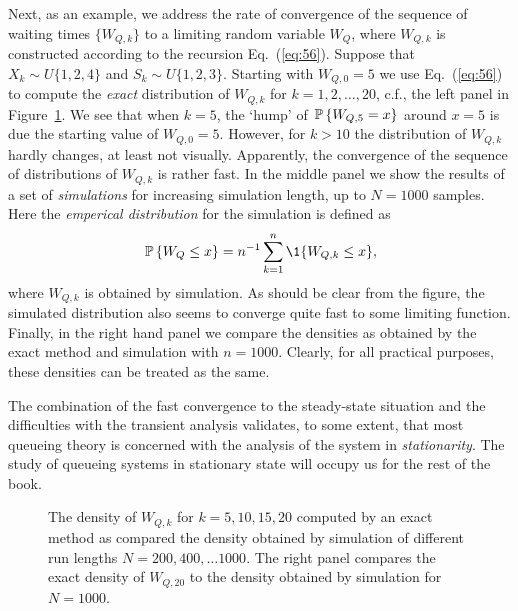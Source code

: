 Next, as an example, we address the rate of convergence of the
sequence of waiting times $\{W_{Q,k}\}$ to a limiting random variable
$W_Q$, where $W_{Q,k}$ is constructed according to the recursion
Eq.~(\ref{eq:56}). Suppose that $X_k\sim U\{1,2,4\}$ and
$S_k\sim U\{1,2,3\}$.  Starting with $W_{Q,0}=5$ we use
Eq.~(\ref{eq:56}) to compute the \emph{exact} distribution of
$W_{Q,k}$ for $k=1,2,\ldots, 20$, c.f., the left panel in
Figure~\ref{fig:convergence}. We see that when $k=5$, the `hump' of
$\P{W_{Q,5}=x}$ around $x=5$ is due the starting value of
$W_{Q,0}=5$. However, for $k>10$ the distribution of $W_{Q,k}$ hardly
changes, at least not visually. Apparently, the convergence of the
sequence of distributions of $W_{Q,k}$ is rather fast. In the middle
panel we show the results of a set of \emph{simulations} for
increasing simulation length, up to $N=1000$ samples. Here the \emph{emperical distribution} for the simulation is defined as
\begin{equation*}
\P{W_Q\leq x} =   n^{-1}\sum_{k=1}^n \1{W_{Q,k} \leq x},
\end{equation*}
where $W_{Q,k}$ is obtained by simulation. As should be clear from the
figure, the simulated distribution also seems to converge quite fast to
some limiting function. Finally, in the right hand panel we compare
the densities as obtained by the exact method and simulation with
$n=1000$. Clearly, for all practical purposes, these densities can be
treated as the same.

The combination of the fast convergence to the steady-state situation
and the difficulties with the transient analysis validates, to some
extent, that most queueing theory is concerned with the analysis of
the system in \emph{stationarity}. The study of queueing systems in
stationary state will occupy us for the rest of the book.

\begin{figure}
  \centering



  \caption{The density of $W_{Q,k}$ for $k=5, 10, 15, 20$ computed by
    an exact method as compared the density obtained by simulation of
    different run lengths $N=200, 400, \ldots 1000$. The right panel
    compares the exact density of $W_{Q,20}$ to the density obtained by simulation
    for $N=1000$.}
\label{fig:convergence}
\end{figure}



